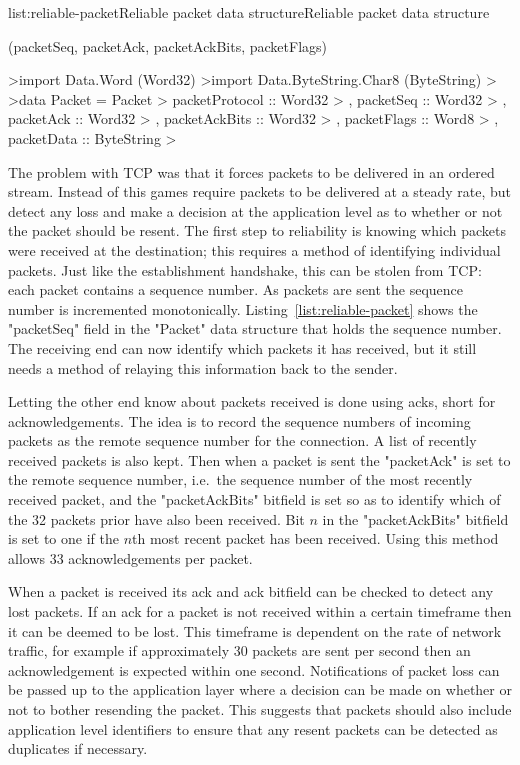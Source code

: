 
\vspace{-0.5em}
\begin{listing}{list:reliable-packet}{Reliable packet data structure}{Reliable packet data structure}{}
\end{listing}\vspace{-1.5em}

\functions(packetSeq, packetAck, packetAckBits, packetFlags)
\begin{haskell}
>import Data.Word (Word32)
>import Data.ByteString.Char8 (ByteString)
>
>data Packet = Packet
>  { packetProtocol :: Word32
>  , packetSeq :: Word32
>  , packetAck :: Word32
>  , packetAckBits :: Word32
>  , packetFlags :: Word8
>  , packetData :: ByteString
>  }

\end{haskell}
\noindent
The problem with TCP was that it forces packets to be delivered in an ordered stream. Instead
of this games require packets to be delivered at a steady rate, but detect any loss and make a
decision at the application level as to whether or not the packet should be resent. The first
step to reliability is knowing which packets were received at the destination; this requires
a method of identifying individual packets. Just like the establishment handshake, this can be
stolen from TCP: each packet contains a sequence number. As packets are sent the sequence number
is incremented monotonically. Listing~\ref{list:reliable-packet} shows the "packetSeq" field in
the "Packet" data structure that holds the sequence number. The receiving end can now identify
which packets it has received, but it still needs a method of relaying this information back
to the sender.

Letting the other end know about packets received is done using acks, short for acknowledgements.
The idea is to record the sequence numbers of incoming packets as the remote sequence number for
the connection. A list of recently received packets is also kept. Then when a packet is sent the
"packetAck" is set to the remote sequence number, i.e.\ the sequence number of the most recently
received packet, and the "packetAckBits" bitfield is set so as to identify which of the 32 packets
prior have also been received. Bit $n$ in the "packetAckBits" bitfield is set to one if the $n$th
most recent packet has been received. Using this method allows 33 acknowledgements per packet.

When a packet is received its ack and ack bitfield can be checked to detect any lost packets.
If an ack for a packet is not received within a certain timeframe then it can be deemed to be
lost. This timeframe is dependent on the rate of network traffic, for example if approximately
30 packets are sent per second then an acknowledgement is expected within one second. Notifications
of packet loss can be passed up to the application layer where a decision can be made on whether
or not to bother resending the packet. This suggests that packets should also include application
level identifiers to ensure that any resent packets can be detected as duplicates if necessary.

